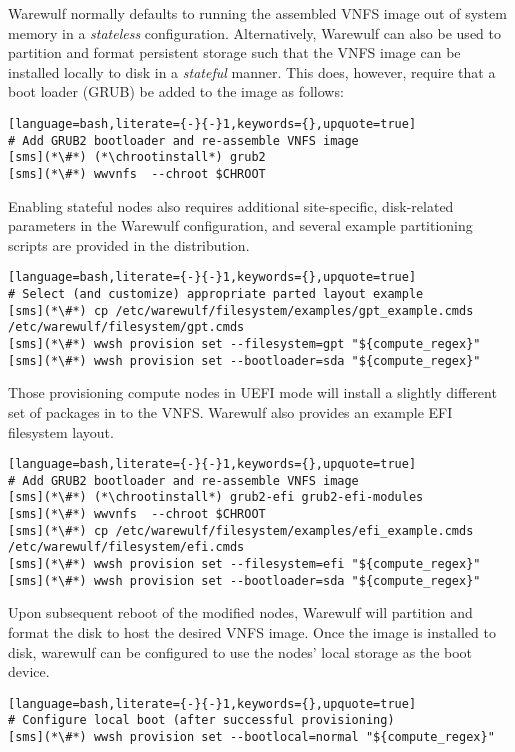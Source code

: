 Warewulf normally defaults to running the assembled VNFS image out of system
memory in a {\em stateless} configuration. Alternatively, Warewulf can also be
used to partition and format persistent storage such that the VNFS image can be
installed locally to disk in a {\em stateful} manner.  This does, however,
require that a boot loader (GRUB) be added to the image as follows:

\begin{lstlisting}[language=bash,literate={-}{-}1,keywords={},upquote=true]
# Add GRUB2 bootloader and re-assemble VNFS image
[sms](*\#*) (*\chrootinstall*) grub2
[sms](*\#*) wwvnfs  --chroot $CHROOT
\end{lstlisting}

\noindent Enabling stateful nodes also requires additional site-specific, disk-related
parameters in the Warewulf configuration, and several example partitioning scripts are
provided in the distribution.

\begin{lstlisting}[language=bash,literate={-}{-}1,keywords={},upquote=true]
# Select (and customize) appropriate parted layout example
[sms](*\#*) cp /etc/warewulf/filesystem/examples/gpt_example.cmds /etc/warewulf/filesystem/gpt.cmds
[sms](*\#*) wwsh provision set --filesystem=gpt "${compute_regex}"
[sms](*\#*) wwsh provision set --bootloader=sda "${compute_regex}"
\end{lstlisting}

\begin{center}
\begin{tcolorbox}[]
\small
Those provisioning compute nodes in UEFI mode will install a slightly different
set of packages in to the VNFS. Warewulf also provides an example EFI filesystem
layout.
\begin{lstlisting}[language=bash,literate={-}{-}1,keywords={},upquote=true]
# Add GRUB2 bootloader and re-assemble VNFS image
[sms](*\#*) (*\chrootinstall*) grub2-efi grub2-efi-modules
[sms](*\#*) wwvnfs  --chroot $CHROOT
[sms](*\#*) cp /etc/warewulf/filesystem/examples/efi_example.cmds /etc/warewulf/filesystem/efi.cmds
[sms](*\#*) wwsh provision set --filesystem=efi "${compute_regex}"
[sms](*\#*) wwsh provision set --bootloader=sda "${compute_regex}"
\end{lstlisting}
\end{tcolorbox}
\end{center}

\noindent Upon subsequent reboot of the modified nodes, Warewulf will partition
and format the disk to host the desired VNFS image.  Once the image is installed
to disk, warewulf can be configured to use the nodes' local storage as the boot
device.

\begin{lstlisting}[language=bash,literate={-}{-}1,keywords={},upquote=true]
# Configure local boot (after successful provisioning)
[sms](*\#*) wwsh provision set --bootlocal=normal "${compute_regex}"
\end{lstlisting}
